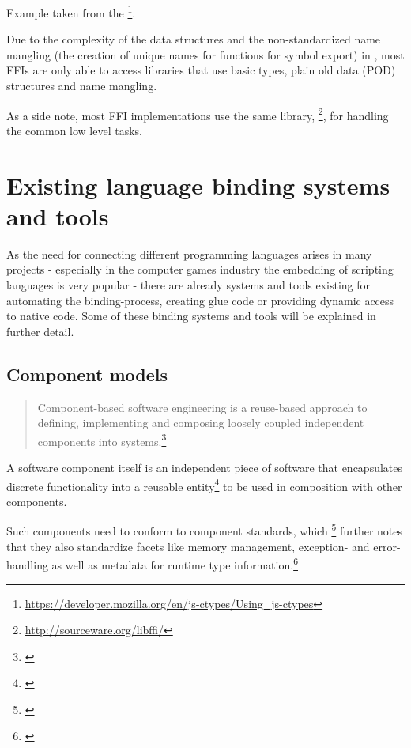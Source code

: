 Example taken from the \footnote{\url{https://developer.mozilla.org/en/js-ctypes/Using_js-ctypes}}.

Due to the complexity of the data structures and the non-standardized name mangling (the creation of unique names for functions for symbol export) in , most FFIs are only able to access libraries that use basic  types, plain old data (POD) structures and  name mangling.

As a side note, most FFI implementations use the same library, \footnote{\url{http://sourceware.org/libffi/}}, for handling the common low level tasks.


\section{Existing language binding systems and tools}

As the need for connecting different programming languages arises in many projects - especially in the computer games industry the embedding of scripting languages is very popular - there are already systems and tools existing for automating the binding-process, creating glue code or providing dynamic access to native code. Some of these binding systems and tools will be explained in further detail.

\subsection{Component models}
\label{sec:ComponentModels}

\begin{quotation}
Component-based software engineering is a reuse-based approach to defining, implementing and composing loosely coupled independent components into systems.\footnote{\citep[460]{Sommerville}}
\end{quotation}

A software component itself is an independent piece of software that encapsulates discrete functionality into a reusable entity\footnote{\citep[3]{ComponentTechnology}} to be used in composition with other components.

Such components need to conform to component standards, which \footnote{\citep[440]{Sommerville}}  further notes that they also standardize facets like memory management, exception- and error-handling as well as metadata for runtime type information.\footnote{\citep[8]{ComponentTechnology}}

